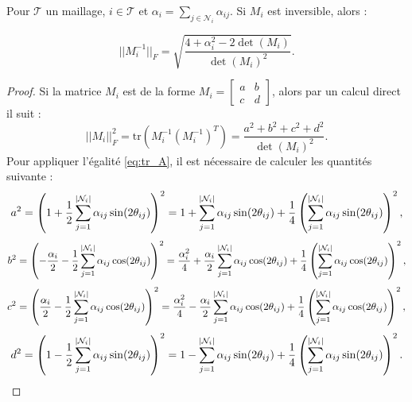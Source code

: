 \documentclass[12pt,a4paper]{article}
\begin{document}
	\begin{lm}\label{lm:maj_gen_Mi}
		Pour $\mathcal T$ un maillage, $i \in \mathcal T$ et $\alpha_i = \underset{j \in \mathcal N_i}\sum \alpha_{ij}$. Si $M_i$ est inversible, alors :
		
		\begin{equation}\label{eq:norme_Mi}
			|\!|M_i^{-1}|\!|_F =\sqrt{\dfrac{4+\alpha_i^2 - 2\det(M_i) }{\det(M_i)^2}}.
		\end{equation}
	\end{lm}
	\begin{proof}
		Si la matrice $M_i$ est de la forme $M_i = \begin{bmatrix}
			a & b\\
			c & d
		\end{bmatrix}$, alors par un calcul direct il suit :
		\begin{equation}\label{eq:tr_A}
			|\!|M_i|\!|_F^2 = \mathrm{tr}\left(M_i^{-1}\left(M_i^{-1}\right)^T\right) = \dfrac{a^2 + b^2 + c^2 + d^2}{\det(M_i)^2}.
		\end{equation}
		Pour appliquer l'égalité \eqref{eq:tr_A}, il est nécessaire de calculer les quantités suivante :
		\begin{equation}
			a^2 = \left(1+\frac12\sum_{j=1}^{\left\lvert \mathcal N_i \right\rvert} \alpha_{ij}\sin(2\theta_{ij})\right)^2 = 1 + \sum_{j=1}^{\left\lvert \mathcal N_i \right\rvert} \alpha_{ij}\sin(2\theta_{ij}) + \frac14\left(\sum_{j=1}^{\left\lvert \mathcal N_i \right\rvert} \alpha_{ij}\sin(2\theta_{ij})\right)^2,
		\end{equation}
		\begin{equation}
			b^2 = \left(-\frac{\alpha_i}2-\frac12\sum_{j=1}^{\left\lvert \mathcal N_i \right\rvert} \alpha_{ij}\cos(2\theta_{ij})\right)^2 = \frac{\alpha_i^2}4 + \frac{\alpha_i}2\sum_{j=1}^{\left\lvert \mathcal N_i \right\rvert} \alpha_{ij}\cos(2\theta_{ij}) + \frac14 \left(\sum_{j=1}^{\left\lvert \mathcal N_i \right\rvert} \alpha_{ij}\cos(2\theta_{ij})\right)^2,
		\end{equation}
		\begin{equation}
			c^2 = \left(\frac{\alpha_i}2 - \frac12\sum_{j=1}^{\left\lvert \mathcal N_i \right\rvert} \alpha_{ij}\cos(2\theta_{ij})\right)^2 = \frac{\alpha_i^2}4 - \frac{\alpha_i}2\sum_{j=1}^{\left\lvert \mathcal N_i \right\rvert} \alpha_{ij}\cos(2\theta_{ij}) + \frac14\left(\sum_{j=1}^{\left\lvert \mathcal N_i \right\rvert} \alpha_{ij}\cos(2\theta_{ij})\right)^2,
		\end{equation}
		\begin{equation}
			d^2 = \left(1-\frac12\sum_{j=1}^{\left\lvert \mathcal N_i \right\rvert} \alpha_{ij}\sin(2\theta_{ij})\right)^2 = 1- \sum_{j=1}^{\left\lvert \mathcal N_i \right\rvert} \alpha_{ij}\sin(2\theta_{ij}) + \frac14\left(\sum_{j=1}^{\left\lvert \mathcal N_i \right\rvert} \alpha_{ij}\sin(2\theta_{ij})\right)^2.
		\end{equation}
		

\end{proof}
\end{document}
